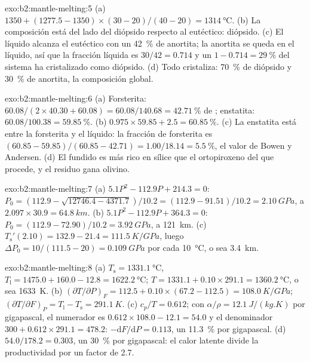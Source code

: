 \begin{solution}{exo:b2:mantle-melting:5}
(a) $1350 + (1277.5 - 1350)\times(30 - 20)/(40 - 20) = \qty{1314}{\celsius}$.
(b) La composición está del lado del diópsido respecto al eutéctico: diópsido.
(c) El líquido alcanza el eutéctico con un \qty{42}{\percent} de anortita; la anortita
se queda en el líquido, así que la fracción líquida es $30/42 = 0.714$ y un $1 - 0.714 =
\qty{29}{\percent}$ del sistema ha cristalizado como diópsido. (d) Todo
cristaliza: \qty{70}{\percent} de diópsido y \qty{30}{\percent} de anortita, la
composición global.
\end{solution}

\begin{solution}{exo:b2:mantle-melting:6}
(a) Forsterita: $60.08/(2\times40.30 + 60.08) = 60.08/140.68 =
\qty{42.71}{\percent}$ de ; enstatita: $60.08/100.38 = \qty{59.85}{\percent}$.
(b) $0.975\times59.85 + 2.5 = \qty{60.85}{\percent}$. (c) La enstatita está entre la
forsterita y el líquido: la fracción de forsterita es $(60.85 - 59.85)/(60.85 -
42.71) = 1.00/18.14 = \qty{5.5}{\percent}$, el valor de Bowen y Andersen. (d) El
fundido es más rico en sílice que el ortopiroxeno del que procede, y el residuo
gana olivino.
\end{solution}

\begin{solution}{exo:b2:mantle-melting:7}
(a) $5.1P^2 - 112.9P + 214.3 = 0$: $P_0 = (112.9 - \sqrt{12746.4 -
4371.7})/10.2 = (112.9 - 91.51)/10.2 = \qty{2.10}{GPa}$, a $2.097\times30.9 =
\qty{64.8}{km}$. (b) $5.1P^2 - 112.9P + 364.3 = 0$: $P_0 = (112.9 -
72.90)/10.2 = \qty{3.92}{GPa}$, a \qty{121}{km}. (c) $T_{\mathrm s}'(2.10) = 132.9
- 21.4 = \qty{111.5}{K/GPa}$, luego $\Delta P_0 = 10/(111.5 - 20) = \qty{0.109}{GPa}$
por cada \qty{10}{\celsius}, o sea \qty{3.4}{km}.
\end{solution}

\begin{solution}{exo:b2:mantle-melting:8}
(a) $T_{\mathrm s} = \qty{1331.1}{\celsius}$, $T_{\mathrm l} = 1475.0 + 160.0 -
12.8 = \qty{1622.2}{\celsius}$; $T = 1331.1 + 0.10\times291.1 =
\qty{1360.2}{\celsius}$, o sea \qty{1633}{K}. (b) $(\partial T/\partial P)_F = 112.5
+ 0.10\times(67.2 - 112.5) = \qty{108.0}{K/GPa}$; $(\partial T/\partial F)_P =
T_{\mathrm l} - T_{\mathrm s} = \qty{291.1}{K}$. (c) $c_p/T = 0.612$; con $\alpha/\rho
= \qty{12.1}{J/(kg.K)}$ por gigapascal, el numerador es $0.612\times108.0 - 12.1
= 54.0$ y el denominador $300 + 0.612\times291.1 = 478.2$: $-\mathrm dF/\mathrm
dP = 0.113$, un \qty{11.3}{\percent} por gigapascal. (d) $54.0/178.2 = 0.303$,
un \qty{30}{\percent} por gigapascal: el calor latente divide la productividad por un
factor de 2.7.
\end{solution}

